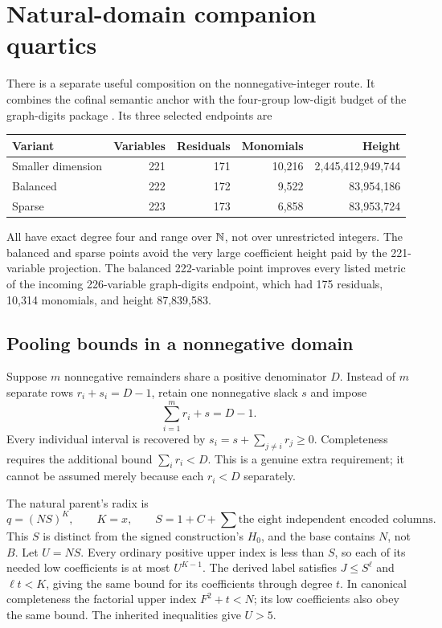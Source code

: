 \section{Natural-domain companion quartics}\label{sec:natural}

There is a separate useful composition on the nonnegative-integer route.
It combines the cofinal semantic anchor with the four-group low-digit
budget of the graph-digits package \cite{cofinal,graphdigits}.  Its three
selected endpoints are
\begin{center}
\begin{tabular}{@{}lrrrr@{}}
\toprule
Variant & Variables & Residuals & Monomials & Height\\
\midrule
Smaller dimension & 221 & 171 & 10,216 & 2,445,412,949,744\\
Balanced & 222 & 172 & 9,522 & 83,954,186\\
Sparse & 223 & 173 & 6,858 & 83,953,724\\
\bottomrule
\end{tabular}
\end{center}
All have exact degree four and range over $\mathbb N$, not over unrestricted
integers. The balanced and sparse points avoid the very large coefficient
height paid by the 221-variable projection. The balanced 222-variable
point improves every listed metric of the incoming 226-variable
graph-digits endpoint, which had 175 residuals, 10,314 monomials, and
height 87,839,583.

\subsection{Pooling bounds in a nonnegative domain}

Suppose $m$ nonnegative remainders share a positive denominator $D$.
Instead of $m$ separate rows $r_i+s_i=D-1$, retain one nonnegative slack
$s$ and impose
\begin{equation}\label{eq:nat-pool}
\sum_{i=1}^m r_i+s=D-1.
\end{equation}
Every individual interval is recovered by
$s_i=s+\sum_{j\ne i}r_j\ge0$. Completeness requires the additional
bound $\sum_i r_i<D$. This is a genuine extra requirement; it cannot be
assumed merely because each $r_i<D$ separately.

The natural parent's radix is
\[
q=(NS)^K,\qquad K=x,\qquad
S=1+C+\sum\text{the eight independent encoded columns}.
\]
This $S$ is distinct from the signed construction's $H_0$, and the base
contains $N$, not $B$. Let $U=NS$. Every ordinary positive upper index is
less than $S$, so each of its needed low coefficients is at most
$U^{K-1}$. The derived label satisfies $J\le S^\ell$ and
$\ell t<K$, giving the same bound for its coefficients through degree
$t$. In canonical completeness the factorial upper index $F^2+t<N$;
its low coefficients also obey the same bound. The inherited inequalities
give $U>5$.

